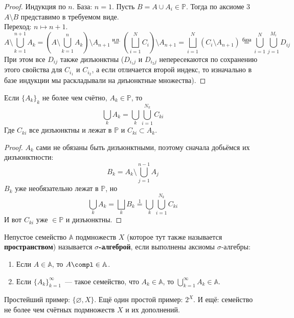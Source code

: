 \documentclass{article}
\begin{document}
    \begin{proof}
        Индукция по $n$. База: $n=1$. Пусть $B=A\cup A_i\in\mathbb P$. Тогда по аксиоме 3 $A\setminus B$ представимо в требуемом виде.\\
        Переход: $n\mapsto n+1$.
        $$
        A\setminus\bigcup_{k=1}^{n+1}A_k=\left(A\setminus\bigcup_{k=1}^nA_k\right)\setminus A_{n+1}\overset{\text{и.п.}}=\left(\bigsqcup\limits_{i=1}^N C_i\right)\setminus A_{n+1}=\bigsqcup\limits_{i=1}^N(C_i\setminus A_{n+1})\overset{\text{база}}=\bigcup\limits_{i=1}^N\bigcup\limits_{j=1}^{M_i}D_{ij}
        $$
        При этом все $D_{ij}$ также дизъюнктны ($D_{i_1j}$ и $D_{i_2j}$ непересекаются по сохранению этого свойства для $C_{i_1}$ и $C_{i_2}$, а если отличается второй индекс, то изначально в базе индукции мы раскладывали на диъюнктные множества).
    \end{proof}
    \begin{property}
        \label{prop:2 полукольца}
        Если $\{A_k\}_k$ не более чем счётно, $A_k\in\mathbb P$, то $$\bigcup\limits_kA_k=\bigcup\limits_k\bigcup\limits_{i=1}^{N_k}C_{ki}$$
        Где $C_{ki}$ все дизъюнктны и лежат в $\mathbb P$ и $C_{ki}\subset A_k$.
    \end{property}
    \begin{proof}
        $A_k$ сами не обязаны быть дизъюнктными, поэтому сначала добьёмся их дизъюнктности:
        $$
        B_k=A_k\setminus\bigcup\limits_{j=1}^{n-1}A_j
        $$
        $B_k$ уже необязательно лежат в $\mathbb P$, но
        $$\bigcup\limits_k A_k=\bigsqcup\limits_k B_k\overset{\text{1}}=\bigcup\limits_k\bigcup\limits_{i=1}^{N_k} C_{ki}$$
        И вот $C_{ki}$ уже $\in\mathbb P$ и дизъюнктны.
    \end{proof}
    \begin{definition}
        Непустое семейство $\mathbb A$ подмножеств $X$ (которое тут также называется \textbf{пространством}) называется \textbf{$\sigma$-алгеброй}, если выполнены аксиомы $\sigma$-алгебры:
        \begin{enumerate}
            \item Если $A\in\mathbb A$, то $A\compl\in\mathbb A$.
            \item Если $\{A_k\}_{k=1}^\infty$~--- такое семейство, что $A_k\in\mathbb A$, то $\bigcup\limits_{k=1}^\infty A_k\in\mathbb A$.
        \end{enumerate}
    \end{definition}
    \begin{example}
        Простейший пример: $\{\varnothing,X\}$. Ещё один простой пример: $2^X$. И ещё: семейство не более чем счётных подмножеств $X$ и их дополнений.
    \end{example}
\end{document}
